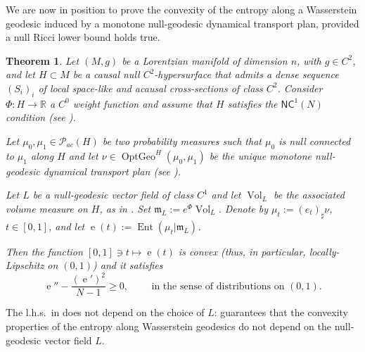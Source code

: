 \documentclass[12pt,a4paper]{amsart}
\theoremstyle{plain}
\newtheorem{theorem}[lemma]{Theorem}
\theoremstyle{definition}
\numberwithin{equation}{section}
\newcommand{\R}{\mathbb{R}}
\DeclareMathOperator{\Ent}{Ent}
\DeclareMathOperator{\OptGeo}{OptGeo}
\DeclareMathOperator{\ee}{e}
\DeclareMathOperator{\vol}{Vol}
\newcommand{\NC}{\mathsf{NC}}
\newcommand{\Prob}{\mathcal P}
\newcommand{\mm}{\mathfrak m}
\begin{document}
We are now in position to prove 
 the convexity of the entropy along a Wasserstein geodesic
induced by a monotone null-geodesic dynamical transport
plan, provided a null Ricci lower bound holds true. 
%


\begin{theorem}
  \label{T:convexity-of-entropy-null}
  Let $(M,g)$ be a Lorentzian manifold of
  dimension $n$, with $g\in C^2$,  and   let $H\subset M$ be a causal null $C^2$-hypersurface that
  admits a dense  sequence $(S_i)_i$ of local space-like and
  acausal cross-sections of class $C^2$.
  Consider $\Phi:H\to \R$ a $C^{0}$
  weight function and  assume  that $H$ satisfies the
    $\NC^1(N)$ condition (see ). 


  Let $\mu_0,\mu_1\in \Prob_{ac}(H)$ be two probability measures
  such that $\mu_0$ is null connected to $\mu_1$ along $H$
  and let $\nu\in\OptGeo^H(\mu_0,\mu_1)$ be the unique monotone null-geodesic
  dynamical transport plan (see ).

Let $L$ be a null-geodesic vector field of class $C^1$  and let $\vol_L$ be the associated volume measure on $H$, as in . Set $\mm_L:=e^{\Phi} \vol_L$. Denote by $\mu_t:=(e_t)_{\sharp}\nu$, $t\in [0,1]$, and let $\ee(t):=\Ent(\mu_t|\mm_L)$. 


Then  the function $[0,1]\ni t \mapsto \ee(t)$ is convex (thus, in particular, locally-Lipschitz on $(0,1)$) and it satisfies
  \begin{equation}
    \label{eq:convexity-entropy-0}
    \ee''
    -
    \frac{    (\ee')^2 }{N-1}
    \geq
    0
    ,
    \qquad
    \text{ 
  in the sense of distributions on $(0,1)$.}
  \end{equation}
\end{theorem}

The l.h.s.\ in  does not depend on the choice of $L$:
  guarantees that the
convexity properties of the entropy along Wasserstein geodesics do not
depend on the null-geodesic vector field $L$.
%
\end{document}
